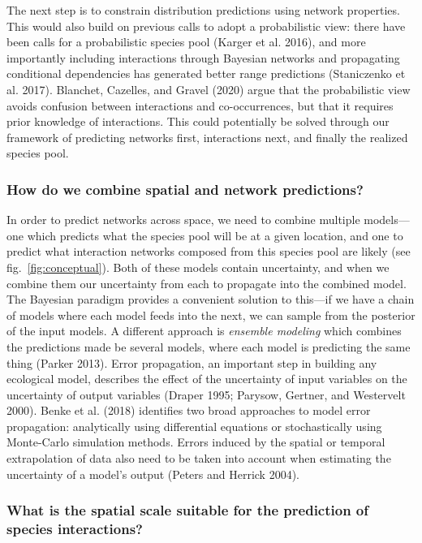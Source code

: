 \documentclass[10pt,oneside]{article}
\begin{document}
The next step is to constrain distribution predictions using network
properties. This would also build on previous calls to adopt a
probabilistic view: there have been calls for a probabilistic species
pool (Karger et al. 2016), and more importantly including interactions
through Bayesian networks and propagating conditional dependencies has
generated better range predictions (Staniczenko et al. 2017). Blanchet,
Cazelles, and Gravel (2020) argue that the probabilistic view avoids
confusion between interactions and co-occurrences, but that it requires
prior knowledge of interactions. This could potentially be solved
through our framework of predicting networks first, interactions next,
and finally the realized species pool.

\hypertarget{how-do-we-combine-spatial-and-network-predictions}{%
\subsubsection{How do we combine spatial and network
predictions?}\label{how-do-we-combine-spatial-and-network-predictions}}

In order to predict networks across space, we need to combine multiple
models---one which predicts what the species pool will be at a given
location, and one to predict what interaction networks composed from
this species pool are likely (see fig.~\ref{fig:conceptual}). Both of
these models contain uncertainty, and when we combine them our
uncertainty from each to propagate into the combined model. The Bayesian
paradigm provides a convenient solution to this---if we have a chain of
models where each model feeds into the next, we can sample from the
posterior of the input models. A different approach is \emph{ensemble
modeling} which combines the predictions made be several models, where
each model is predicting the same thing (Parker 2013). Error
propagation, an important step in building any ecological model,
describes the effect of the uncertainty of input variables on the
uncertainty of output variables (Draper 1995; Parysow, Gertner, and
Westervelt 2000). Benke et al. (2018) identifies two broad approaches to
model error propagation: analytically using differential equations or
stochastically using Monte-Carlo simulation methods. Errors induced by
the spatial or temporal extrapolation of data also need to be taken into
account when estimating the uncertainty of a model's output (Peters and
Herrick 2004).

\hypertarget{what-is-the-spatial-scale-suitable-for-the-prediction-of-species-interactions}{%
\subsubsection{What is the spatial scale suitable for the prediction of
species
interactions?}\label{what-is-the-spatial-scale-suitable-for-the-prediction-of-species-interactions}}
\end{document}
